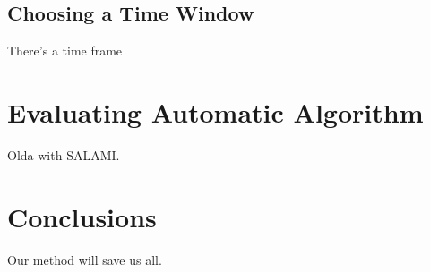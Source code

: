 \documentclass{article}
\begin{document}
\subsection{Choosing a Time Window}

There's a time frame 

\section{Evaluating Automatic Algorithm}

Olda\cite{McFee2014} with SALAMI.




\section{Conclusions}

Our method will save us all.



%
\end{document}
